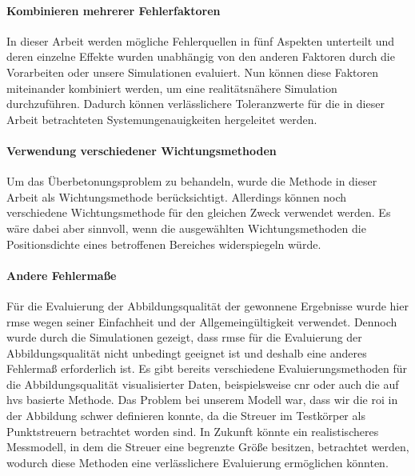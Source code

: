 \paragraph*{Kombinieren mehrerer Fehlerfaktoren}
In dieser Arbeit werden mögliche Fehlerquellen in fünf Aspekten unterteilt und deren einzelne Effekte wurden unabhängig von den anderen Faktoren durch die Vorarbeiten oder unsere Simulationen evaluiert. Nun können diese Faktoren miteinander kombiniert werden, um eine realitätsnähere Simulation durchzuführen. Dadurch können verlässlichere Toleranzwerte für die in dieser Arbeit betrachteten Systemungenauigkeiten hergeleitet werden.

\paragraph*{Verwendung verschiedener Wichtungsmethoden}
Um das Überbetonungsproblem zu behandeln, wurde die  Methode in dieser Arbeit als Wichtungsmethode berücksichtigt. Allerdings können noch verschiedene Wichtungsmethode für den gleichen Zweck verwendet werden. Es wäre dabei aber sinnvoll, wenn die ausgewählten Wichtungsmethoden die Positionsdichte eines betroffenen Bereiches widerspiegeln würde.


\paragraph*{Andere Fehlermaße}
Für die Evaluierung der Abbildungsqualität der gewonnene Ergebnisse wurde hier \acrfull{rmse} wegen seiner Einfachheit und der Allgemeingültigkeit  verwendet. Dennoch wurde durch die Simulationen gezeigt, dass \acrshort{rmse} für die Evaluierung der Abbildungsqualität nicht unbedingt geeignet ist und deshalb eine anderes Fehlermaß erforderlich ist. Es gibt bereits verschiedene Evaluierungsmethoden für die Abbildungsqualität visualisierter Daten, beispielsweise \acrfull{cnr} oder auch die auf \acrfull{hvs} basierte Methode. Das Problem bei unserem Modell war, dass wir die \acrshort{roi} in der Abbildung schwer definieren konnte, da die Streuer im Testkörper als Punktstreuern betrachtet worden sind. In Zukunft könnte ein realistischeres Messmodell, in dem die Streuer eine begrenzte Größe besitzen, betrachtet werden, wodurch diese Methoden eine verlässlichere Evaluierung ermöglichen könnten.
